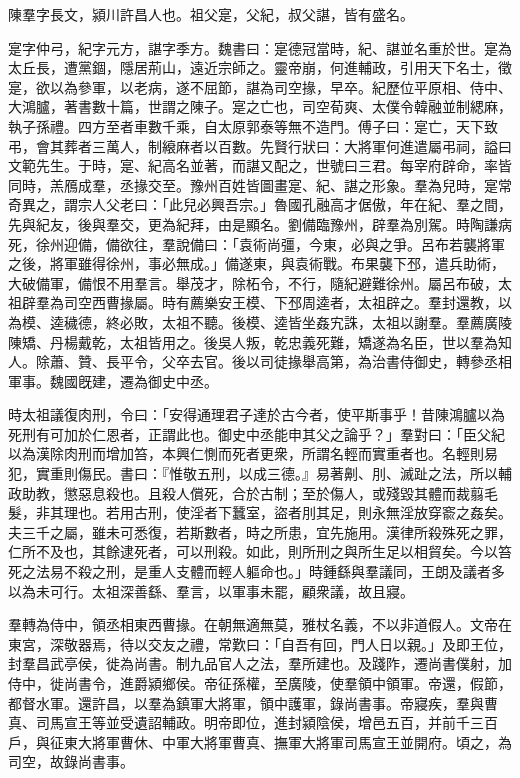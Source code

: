 
\begin{pinyinscope}
陳羣字長文，潁川許昌人也。祖父寔，父紀，叔父諶，皆有盛名。

寔字仲弓，紀字元方，諶字季方。魏書曰：寔德冠當時，紀、諶並名重於世。寔為太丘長，遭黨錮，隱居荊山，遠近宗師之。靈帝崩，何進輔政，引用天下名士，徵寔，欲以為參軍，以老病，遂不屈節，諶為司空掾，早卒。紀歷位平原相、侍中、大鴻臚，著書數十篇，世謂之陳子。寔之亡也，司空荀爽、太僕令韓融並制緦麻，執子孫禮。四方至者車數千乘，自太原郭泰等無不造門。傅子曰：寔亡，天下致弔，會其葬者三萬人，制縗麻者以百數。先賢行狀曰：大將軍何進遣屬弔祠，謚曰文範先生。于時，寔、紀高名並著，而諶又配之，世號曰三君。每宰府辟命，率皆同時，羔鴈成羣，丞掾交至。豫州百姓皆圖畫寔、紀、諶之形象。羣為兒時，寔常奇異之，謂宗人父老曰：「此兒必興吾宗。」魯國孔融高才倨傲，年在紀、羣之間，先與紀友，後與羣交，更為紀拜，由是顯名。劉備臨豫州，辟羣為別駕。時陶謙病死，徐州迎備，備欲往，羣說備曰：「袁術尚彊，今東，必與之爭。呂布若襲將軍之後，將軍雖得徐州，事必無成。」備遂東，與袁術戰。布果襲下邳，遣兵助術，大破備軍，備恨不用羣言。舉茂才，除柘令，不行，隨紀避難徐州。屬呂布破，太祖辟羣為司空西曹掾屬。時有薦樂安王模、下邳周逵者，太祖辟之。羣封還教，以為模、逵穢德，終必敗，太祖不聽。後模、逵皆坐姦宄誅，太祖以謝羣。羣薦廣陵陳矯、丹楊戴乾，太祖皆用之。後吳人叛，乾忠義死難，矯遂為名臣，世以羣為知人。除蕭、贊、長平令，父卒去官。後以司徒掾舉高第，為治書侍御史，轉參丞相軍事。魏國旣建，遷為御史中丞。

時太祖議復肉刑，令曰：「安得通理君子達於古今者，使平斯事乎！昔陳鴻臚以為死刑有可加於仁恩者，正謂此也。御史中丞能申其父之論乎？」羣對曰：「臣父紀以為漢除肉刑而增加笞，本興仁惻而死者更衆，所謂名輕而實重者也。名輕則易犯，實重則傷民。書曰：『惟敬五刑，以成三德。』易著劓、刖、滅趾之法，所以輔政助教，懲惡息殺也。且殺人償死，合於古制；至於傷人，或殘毀其體而裁翦毛髮，非其理也。若用古刑，使淫者下蠶室，盜者刖其足，則永無淫放穿窬之姦矣。夫三千之屬，雖未可悉復，若斯數者，時之所患，宜先施用。漢律所殺殊死之罪，仁所不及也，其餘逮死者，可以刑殺。如此，則所刑之與所生足以相貿矣。今以笞死之法易不殺之刑，是重人支體而輕人軀命也。」時鍾繇與羣議同，王朗及議者多以為未可行。太祖深善繇、羣言，以軍事未罷，顧衆議，故且寢。

羣轉為侍中，領丞相東西曹掾。在朝無適無莫，雅杖名義，不以非道假人。文帝在東宮，深敬器焉，待以交友之禮，常歎曰：「自吾有回，門人日以親。」及即王位，封羣昌武亭侯，徙為尚書。制九品官人之法，羣所建也。及踐阼，遷尚書僕射，加侍中，徙尚書令，進爵潁鄉侯。帝征孫權，至廣陵，使羣領中領軍。帝還，假節，都督水軍。還許昌，以羣為鎮軍大將軍，領中護軍，錄尚書事。帝寢疾，羣與曹真、司馬宣王等並受遺詔輔政。明帝即位，進封潁陰侯，增邑五百，并前千三百戶，與征東大將軍曹休、中軍大將軍曹真、撫軍大將軍司馬宣王並開府。頃之，為司空，故錄尚書事。


\end{pinyinscope}
